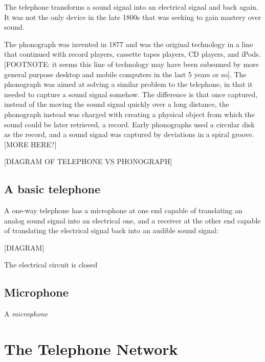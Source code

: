 \documentclass[UTF8]{book}
\begin{document}
\begin{CJK}{UTF8}{gbsn}
The telephone transforms a sound signal into an electrical signal and back again. It was not the only device in the late 1800s that was seeking to gain mastery over sound.

The phonograph was invented in 1877 and was the original technology in a line that continued with record players, cassette tapes players, CD players, and iPods. [FOOTNOTE: it seems this line of technology may have been subsumed by more general purpose desktop and mobile computers in the last 5 years or so]. The phonograph was aimed at solving a similar problem to the telephone, in that it needed to capture a sound signal somehow. The difference is that once captured, instead of the moving the sound signal quickly over a long distance, the phonograph instead was charged with creating a physical object from which the sound could be later retrieved, a record. Early phonographs used a circular disk as the record, and a sound signal was captured by deviations in a spiral groove. [MORE HERE?]

[DIAGRAM OF TELEPHONE VS PHONOGRAPH]

\section{A basic telephone}

A one-way telephone has a microphone at one end capable of translating an analog sound signal into an electrical one, and a receiver at the other end capable of translating the electrical signal back into an audible sound signal:

[DIAGRAM]

The electrical circuit is closed

\section{Microphone}

A \emph{microphone}




\chapter{The Telephone Network}



\end{CJK}
\end{document}
